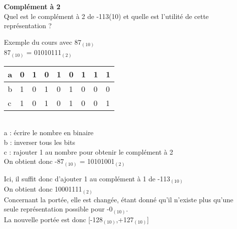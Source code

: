 \begin{Exercice}[3 minutes] \textbf{Complément à 2}\\
    Quel est le complément à 2 de -113(10) et quelle est l'utilité de cette représentation ? \\

    \begin{conseil}
    
    Exemple du cours avec 87$_{(10)}$ \\
    
    87$_{(10)}$ = 01010111$_{(2)}$ \\
    
         \begin{tabular}{| p{1cm} | p{1cm} | p{1cm} | p{1cm} | p{1cm} | p{1cm} | p{1cm} | p{1cm} | p{1cm} |} 
            \hline
            a & 0 & 1 & 0 & 1 & 0 & 1 & 1 & 1 \\ [0.5ex] 
            \hline
            b & 1 & 0 & 1 & 0 & 1 & 0 & 0 & 0 \\ [0.5ex]
            \hline
            c & 1 & 0 & 1 & 0 & 1 & 0 & 0 & 1 \\ [0.5ex]
            \hline
        \end{tabular} \\
        
        a : écrire le nombre en binaire \\
        
        b : inverser tous les bits \\
        
        c : rajouter 1 au nombre pour obtenir le complément à 2 \\
        
        On obtient donc -87$_{(10)}$ = 10101001$_{(2)}$ \\
    \end{conseil}
    
    \begin{solution}
    	Ici, il suffit donc d'ajouter 1 au complément à 1 de -113$_{(10)}$ \\
    	
    	On obtient donc 10001111$_{(2)}$ \\
    	
    	Concernant la portée, elle est changée, étant donné qu'il n'existe plus qu'une seule représentation possible pour -0$_{(10)}$. \\
    	
    	La nouvelle portée est donc [-128$_{(10)}$,+127$_{(10)}$]
        
    \end{solution}
\end{Exercice}

